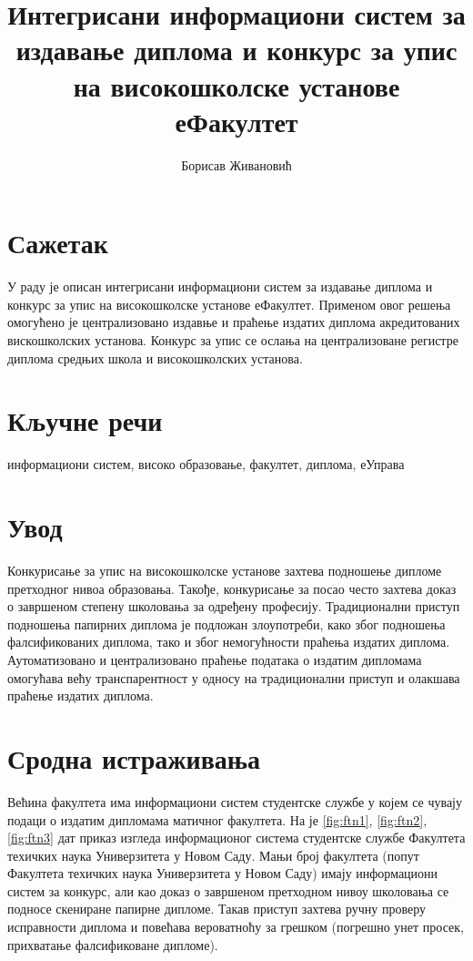 \documentclass[a4paper]{article}
\title{Интегрисани информациони систем за издавање диплома и конкурс за упис на високошколске установе еФакултет}
\author{Борисав Живановић}
\begin{document}
\maketitle

\large

\section*{Сажетак}

У раду је описан интегрисани информациони систем за издавање диплома и конкурс за упис на високошколске установе еФакултет.
Применом овог решења омогућено је централизовано издавње и праћење издатих диплома акредитованих вискошколских установа.
Конкурс за упис се ослања на централизоване регистре диплома средњих школа и високошколских установа.

\section*{Кључне речи}

информациони систем, високо образовање, факултет, диплома, еУправа

\section*{Увод}

Конкурисање за упис на високошколске установе захтева подношење дипломе претходног нивоа образовања.
Такође, конкурисање за посао често захтева доказ о завршеном степену школовања за одређену професију.
Традиционални приступ подношења папирних диплома је подложан злоупотреби, како због подношења фалсификованих диплома,
тако и због немогућности праћења издатих диплома. Аутоматизовано и централизовано праћење података о издатим дипломама
омогућава већу транспарентност у односу на традиционални приступ и олакшава праћење издатих диплома.

\section*{Сродна истраживања}

Већина факултета има информациони систем студентске службе у којем се чувају подаци о издатим дипломама матичног факултета.
На је \autoref{fig:ftn1}, \autoref{fig:ftn2}, \autoref{fig:ftn3} дат приказ изгледа информационог система студентске службе Факултета техичких наука Универзитета у Новом Саду.
Мањи број факултета (попут Факултета техичких наука Универзитета у Новом Саду) имају информациони систем за конкурс, али
као доказ о завршеном претходном нивоу школовања се подносе скениране папирне дипломе. Такав приступ захтева ручну проверу
исправности диплома и повећава вероватноћу за грешком (погрешно унет просек, прихватање фалсификоване дипломе).
\end{document}
